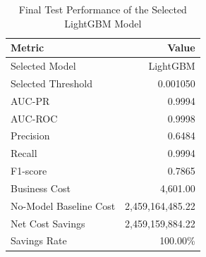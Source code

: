 \begin{table}[H]
\centering
\caption{Final Test Performance of the Selected LightGBM Model}
\label{tab:final_model_performance}
\begin{tabular}{lr}
\hline
\textbf{Metric} & \textbf{Value} \\
\hline
Selected Model & LightGBM \\
Selected Threshold & 0.001050 \\
AUC-PR & 0.9994 \\
AUC-ROC & 0.9998 \\
Precision & 0.6484 \\
Recall & 0.9994 \\
F1-score & 0.7865 \\
Business Cost & 4,601.00 \\
No-Model Baseline Cost & 2,459,164,485.22 \\
Net Cost Savings & 2,459,159,884.22 \\
Savings Rate & 100.00\% \\
\hline
\end{tabular}
\end{table}